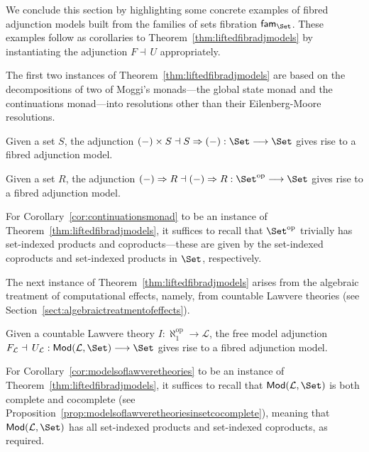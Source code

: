 We conclude this section by highlighting some concrete examples of fibred adjunction models built from the families of sets fibration $\mathsf{fam}_{\Set}$. These examples follow as corollaries to Theorem~\ref{thm:liftedfibradjmodels} by instantiating the adjunction $F \dashv\, U$ appropriately. 

The first two instances of Theorem~\ref{thm:liftedfibradjmodels} are based on the decompositions of two of Moggi's monads---the global state monad and the continuations monad---into resolutions other than their Eilenberg-Moore resolutions.

\begin{corollary}
Given a set $S$, the adjunction $(-) \times S \dashv S \Rightarrow (-) : \Set \longrightarrow \Set$ gives rise to a fibred adjunction model. 
\end{corollary}

\begin{corollary}
\label{cor:continuationsmonad}
Given a set $R$, the adjunction $(-) \Rightarrow R \dashv (-) \Rightarrow R : \Set^{\text{op}} \longrightarrow \Set$ gives rise to a fibred adjunction model. 
\end{corollary}

For Corollary~\ref{cor:continuationsmonad} to be an instance of Theorem~\ref{thm:liftedfibradjmodels}, it suffices to recall that  $\Set^{\text{op}}$ trivially has set-indexed products and coproducts---these are given by the set-indexed coproducts and set-indexed products in $\Set$, respectively.

The next instance of Theorem~\ref{thm:liftedfibradjmodels} arises from the algebraic treatment of computational effects, namely, from countable Lawvere theories (see Section~\ref{sect:algebraictreatmentofeffects}).

\begin{corollary}
\label{cor:modelsoflawveretheories}
Given a countable Lawvere theory $I : \aleph_{\!1}^{\text{op}} \longrightarrow \mathcal{L}$, the free model adjunction $F_{\mathcal{L}} \dashv\, U_{\mathcal{L}} : \mathsf{Mod}(\mathcal{L},\Set) \longrightarrow \Set$ gives rise to a fibred adjunction model. 
\end{corollary}

For Corollary~\ref{cor:modelsoflawveretheories} to be an instance of Theorem~\ref{thm:liftedfibradjmodels}, it suffices to recall that $\mathsf{Mod}(\mathcal{L},\Set)$ is both complete and cocomplete (see Proposition~\ref{prop:modelsoflawveretheoriesinsetcocomplete}), meaning that $\mathsf{Mod}(\mathcal{L},\Set)$ has all set-indexed products and set-indexed coproducts, as required.

